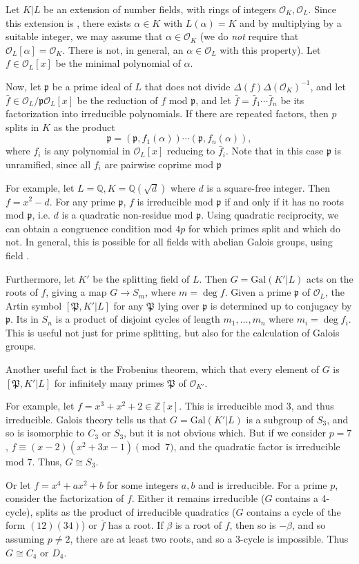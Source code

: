 \documentclass[12pt]{article}
\newcommand{\p}{\mathfrak{p}}
\renewcommand{\P}{\mathfrak{P}}
\renewcommand{\O}{\mathcal{O}}
\newcommand{\Q}{\mathbb{Q}}
\newcommand{\Z}{\mathbb{Z}}
\begin{document}
Let $K|L$ be an extension of number fields, with rings of integers $\O_K,\O_L$.  Since this extension is , there exists $\alpha\in K$ with $L(\alpha)=K$ and by multiplying by a suitable integer, we may assume that $\alpha\in\O_K$ (we do {\em not} require that $\O_L[\alpha]=\O_K$.  There is not, in general, an $\alpha\in\O_L$ with this property).  Let $f\in \O_L[x]$ be the minimal polynomial of $\alpha$.

Now, let $\p$ be a prime ideal of $L$ that does not divide $\Delta(f)\Delta(\O_K)^{-1}$, and let $\bar{f}\in \O_L/\p\O_L[x]$ be the reduction of $f$ mod $\p$, and let $\bar{f}=\bar{f}_1\cdots \bar{f}_n$ be its factorization into irreducible polynomials.  If there are repeated factors, then $p$ splits in $K$ as the product $$\p=(\p,f_1(\alpha))\cdots(\p,f_n(\alpha)),$$ where $f_i$ is any polynomial in $\O_L[x]$ reducing to $\bar{f}_i$.  Note that in this case $\p$ is unramified, since all $f_i$ are pairwise coprime mod $\p$

For example, let $L=\Q, K=\Q(\sqrt{d})$ where $d$ is a square-free integer.
Then $f=x^2-d$.  For any prime $\p$, $f$ is irreducible mod $\p$ if and only if it has no roots mod $\p$, i.e. $d$ is a quadratic non-residue mod $\p$.  Using quadratic reciprocity, we can obtain a congruence condition mod $4p$ for which primes split and which do not.  In general, this is possible for all fields with abelian Galois groups, using  field .

Furthermore, let $K'$ be the splitting field of $L$.  Then $G=\mathrm{Gal}(K'|L)$ acts on the roots of $f$, giving a map $G\to S_m$, where $m=\deg f$.  Given a prime $\p$ of $\O_L$, the Artin symbol $[\P,K'|L]$ for any $\P$ lying over $\p$ is determined up to conjugacy by $\p$.  Its  in $S_n$ is a product of disjoint cycles of length $m_1,\ldots,m_n$ where $m_i=\deg f_i$.
This  is useful not just for prime splitting, but also for the calculation of Galois groups.

Another useful fact is the Frobenius  theorem, which  that every element of $G$ is $[\P,K'|L]$ for infinitely many primes $\P$ of $\O_{K'}$.

For example, let $f=x^3+x^2+2\in\Z[x]$.  This is irreducible mod 3, and thus irreducible.  Galois theory tells us that $G=\mathrm{Gal}(K'|L)$ is a subgroup of $S_3$, and so is isomorphic to $C_3$ or $S_3$, but it is not obvious which.  But if we consider $p=7$, $f\equiv (x-2)(x^2+3x-1)\pmod 7$, and the quadratic factor is irreducible mod 7.  Thus, $G\cong S_3$.

Or let $f=x^4+ax^2+b$ for some integers $a,b$ and is irreducible.  For a prime $p$, consider the factorization of $f$.  Either it remains irreducible ($G$ contains a 4-cycle), splits as the product of irreducible quadratics ($G$ contains a cycle of the form $(12)(34)$) or $\bar{f}$ has a root.  If $\beta$ is a root of $f$, then so is $-\beta$, and so assuming $p\neq 2$, there are at least two roots, and so a 3-cycle is impossible.  Thus $G\cong C_4$ or $D_4$.
\end{document}
